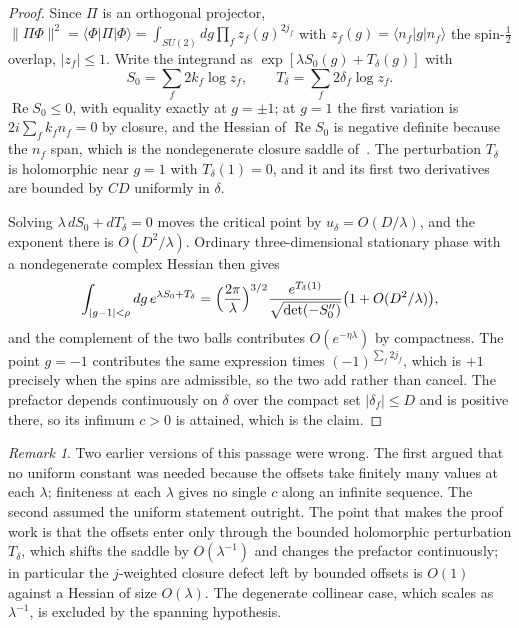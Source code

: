 \documentclass[11pt]{article}
\numberwithin{equation}{section}
\theoremstyle{definition}
\theoremstyle{remark}
\newtheorem{remark}[theorem]{Remark}
\newcommand{\SUtwo}{SU(2)}
\renewcommand{\Re}{\operatorname{Re}}
\begin{document}
\begin{proof}
Since $\Pi$ is an orthogonal projector,
$\|\Pi\Phi\|^2=\langle\Phi|\Pi|\Phi\rangle=\int_{\SUtwo}dg\prod_fz_f(g)^{2j_f}$
with $z_f(g)=\langle n_f|g|n_f\rangle$ the spin-$\tfrac12$ overlap, $|z_f|\le1$.
Write the integrand as $\exp[\lambda S_0(g)+T_\delta(g)]$ with
\[
S_0=\sum_f2k_f\log z_f,\qquad T_\delta=\sum_f2\delta_f\log z_f .
\]
$\Re S_0\le0$, with equality exactly at $g=\pm1$; at $g=1$ the first variation is
$2i\sum_fk_fn_f=0$ by closure, and the Hessian of $\Re S_0$ is negative definite
because the $n_f$ span, which is the nondegenerate closure saddle
of~\cite{LivineSpeziale2007}. The perturbation $T_\delta$ is holomorphic near
$g=1$ with $T_\delta(1)=0$, and it and its first two derivatives are bounded by
$CD$ uniformly in $\delta$.

Solving $\lambda\,dS_0+dT_\delta=0$ moves the critical point by
$u_\delta=O(D/\lambda)$, and the exponent there is $O(D^2/\lambda)$. Ordinary
three-dimensional stationary phase with a nondegenerate complex Hessian then
gives
\[
\int_{|g-1|<\rho}dg\,e^{\lambda S_0+T_\delta}
=\Bigl(\frac{2\pi}{\lambda}\Bigr)^{3/2}
\frac{e^{T_\delta(1)}}{\sqrt{\det(-S_0'')}}\bigl(1+O(D^2/\lambda)\bigr),
\]
and the complement of the two balls contributes $O(e^{-\eta\lambda})$ by
compactness. The point $g=-1$ contributes the same expression times
$(-1)^{\sum_f2j_f}$, which is $+1$ precisely when the spins are admissible, so
the two add rather than cancel. The prefactor depends continuously on
$\delta$ over the compact set $|\delta_f|\le D$ and is positive there, so its
infimum $c>0$ is attained, which is the claim.
\end{proof}

\begin{remark}
Two earlier versions of this passage were wrong. The first argued that no uniform
constant was needed because the offsets take finitely many values at each
$\lambda$; finiteness at each $\lambda$ gives no single $c$ along an infinite
sequence. The second assumed the uniform statement outright. The point that makes
the proof work is that the offsets enter only through the bounded holomorphic
perturbation $T_\delta$, which shifts the saddle by $O(\lambda^{-1})$ and changes
the prefactor continuously; in particular the $j$-weighted closure defect left by
bounded offsets is $O(1)$ against a Hessian of size $O(\lambda)$. The degenerate
collinear case, which scales as $\lambda^{-1}$, is excluded by the spanning
hypothesis.
\end{remark}
\end{document}
